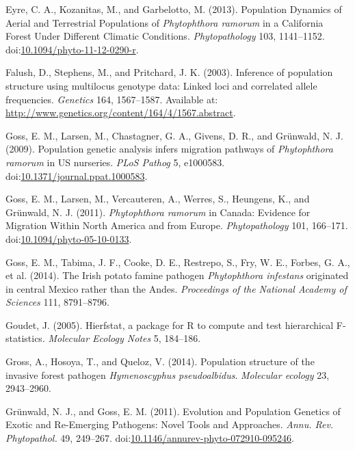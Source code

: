 \documentclass[double,12pt]{beavtex}
\begin{document}
  \hypertarget{ref-eyre2013poulation}{}
  Eyre, C. A., Kozanitas, M., and Garbelotto, M. (2013). Population
  Dynamics of Aerial and Terrestrial Populations of \emph{Phytophthora
  ramorum} in a California Forest Under Different Climatic Conditions.
  \emph{Phytopathology} 103, 1141--1152.
  doi:\href{https://doi.org/10.1094/phyto-11-12-0290-r}{10.1094/phyto-11-12-0290-r}.
  
  \hypertarget{ref-Falush01082003}{}
  Falush, D., Stephens, M., and Pritchard, J. K. (2003). Inference of
  population structure using multilocus genotype data: Linked loci and
  correlated allele frequencies. \emph{Genetics} 164, 1567--1587.
  Available at: \url{http://www.genetics.org/content/164/4/1567.abstract}.
  
  \hypertarget{ref-goss2009population}{}
  Goss, E. M., Larsen, M., Chastagner, G. A., Givens, D. R., and Grünwald,
  N. J. (2009). Population genetic analysis infers migration pathways of
  \emph{Phytophthora ramorum} in US nurseries. \emph{PLoS Pathog} 5,
  e1000583.
  doi:\href{https://doi.org/10.1371/journal.ppat.1000583}{10.1371/journal.ppat.1000583}.
  
  \hypertarget{ref-goss2011phytophthora}{}
  Goss, E. M., Larsen, M., Vercauteren, A., Werres, S., Heungens, K., and
  Grünwald, N. J. (2011). \emph{Phytophthora ramorum} in Canada: Evidence
  for Migration Within North America and from Europe.
  \emph{Phytopathology} 101, 166--171.
  doi:\href{https://doi.org/10.1094/phyto-05-10-0133}{10.1094/phyto-05-10-0133}.
  
  \hypertarget{ref-goss2014irish}{}
  Goss, E. M., Tabima, J. F., Cooke, D. E., Restrepo, S., Fry, W. E.,
  Forbes, G. A., et al. (2014). The Irish potato famine pathogen
  \emph{Phytophthora infestans} originated in central Mexico rather than
  the Andes. \emph{Proceedings of the National Academy of Sciences} 111,
  8791--8796.
  
  \hypertarget{ref-goudet2005hierfstat}{}
  Goudet, J. (2005). Hierfstat, a package for R to compute and test
  hierarchical F-statistics. \emph{Molecular Ecology Notes} 5, 184--186.
  
  \hypertarget{ref-gross2014population}{}
  Gross, A., Hosoya, T., and Queloz, V. (2014). Population structure of
  the invasive forest pathogen \emph{Hymenoscyphus pseudoalbidus}.
  \emph{Molecular ecology} 23, 2943--2960.
  
  \hypertarget{ref-grunwald2011evolution}{}
  Grünwald, N. J., and Goss, E. M. (2011). Evolution and Population
  Genetics of Exotic and Re-Emerging Pathogens: Novel Tools and
  Approaches. \emph{Annu. Rev. Phytopathol.} 49, 249--267.
  doi:\href{https://doi.org/10.1146/annurev-phyto-072910-095246}{10.1146/annurev-phyto-072910-095246}.
  
\end{document}
